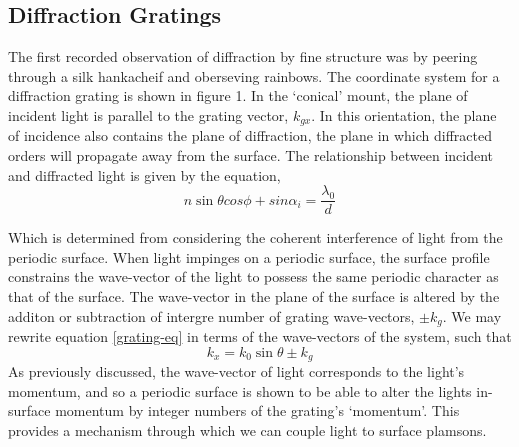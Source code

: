 \documentclass[oneside,10pt,a4paper]{book}
\begin{document}
\subsection{Diffraction Gratings}
The first recorded observation of diffraction by fine structure was by peering through a silk hankacheif and oberseving rainbows. 
The coordinate system for a diffraction grating is shown in figure 1. In the `conical' mount, the plane of incident light is parallel to the grating vector, $k_{gx}$. In this orientation, the plane of incidence also contains the plane of diffraction, the plane in which diffracted orders will propagate away from the surface. The relationship between incident and diffracted light is given by the equation,
\begin{equation}
n \sin{\theta}cos{\phi} + sin{\alpha_i} = \frac{\lambda_0}{d}\label{grating-eq}
\end{equation}

Which is determined from considering the coherent interference of light from the periodic surface. 
When light impinges on a periodic surface, the surface profile constrains the wave-vector of the light to possess the same periodic character as that of the surface. The wave-vector in the plane of the surface is altered by the additon or subtraction of intergre number of grating wave-vectors, $\pm k_g$. We may rewrite equation \ref{grating-eq} in terms of the wave-vectors of the system, such that
\begin{equation}
k_x = k_0\sin{\theta}\pm k_g\label{eq:grating-momentum}
\end{equation}
As previously discussed, the wave-vector of light corresponds to the light's momentum, and so a periodic surface is shown to be able to alter the lights in-surface momentum by integer numbers of the grating's `momentum'. This provides a mechanism through which we can couple light to surface plamsons. 
\end{document}
